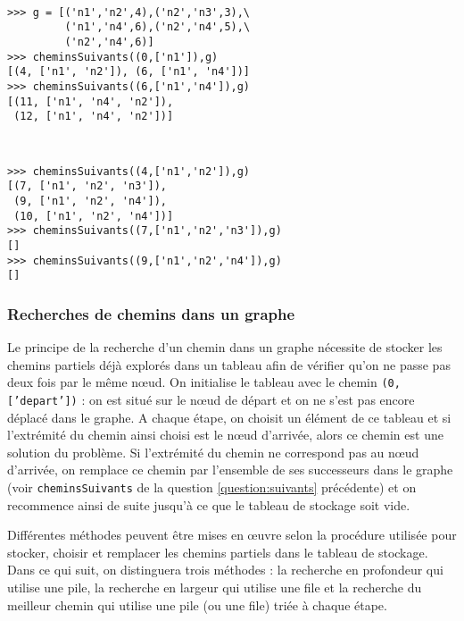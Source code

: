 \begin{question}
\begin{enumerate}
\noindent\begin{minipage}[t]{6cm}\tt\footnotesize
\begin{Verbatim}
>>> g = [('n1','n2',4),('n2','n3',3),\
         ('n1','n4',6),('n2','n4',5),\
         ('n2','n4',6)]
>>> cheminsSuivants((0,['n1']),g)
[(4, ['n1', 'n2']), (6, ['n1', 'n4'])]
>>> cheminsSuivants((6,['n1','n4']),g)
[(11, ['n1', 'n4', 'n2']), 
 (12, ['n1', 'n4', 'n2'])]
\end{Verbatim}
\end{minipage}
\hfill
\begin{minipage}[t]{6cm}\tt\footnotesize
\begin{Verbatim}
>>> cheminsSuivants((4,['n1','n2']),g)
[(7, ['n1', 'n2', 'n3']), 
 (9, ['n1', 'n2', 'n4']), 
 (10, ['n1', 'n2', 'n4'])]
>>> cheminsSuivants((7,['n1','n2','n3']),g)
[]
>>> cheminsSuivants((9,['n1','n2','n4']),g)
[]
\end{Verbatim}
\end{minipage}
\vspace*{2mm}

\end{enumerate}
\end{question}

\subsubsection{Recherches de chemins dans un graphe}\label{subsec:recherches}
Le principe de la recherche d'un chemin dans un graphe nécessite de stocker 
les chemins partiels déjà explorés dans un tableau afin de vérifier qu'on ne passe
pas deux fois par le même n\oe ud. On initialise le tableau avec le chemin \texttt{(0,['depart'])} : on est
situé sur le n\oe ud de départ et on ne s'est pas encore déplacé dans le graphe. 
A chaque étape, on choisit un élément de ce tableau et si l'extrémité du chemin ainsi choisi 
est le n\oe ud d'arrivée, alors ce chemin est une solution du problème.
Si l'extrémité du chemin ne correspond pas au n\oe ud d'arrivée, on remplace ce chemin par l'ensemble de ses successeurs dans le graphe (voir \texttt{cheminsSuivants} de la 
question \ref{question:suivants} précédente) et on recommence ainsi de suite jusqu'à ce que
le tableau de stockage soit vide.

Différentes méthodes peuvent être mises en \oe uvre selon la procédure utilisée pour
stocker, choisir et remplacer les chemins partiels dans le tableau de stockage. 
Dans ce qui suit, on distinguera trois méthodes : la recherche en profondeur
qui utilise une pile, 
la recherche en largeur qui utilise une file et la recherche du meilleur chemin
qui utilise une pile (ou une file) triée à chaque étape.

